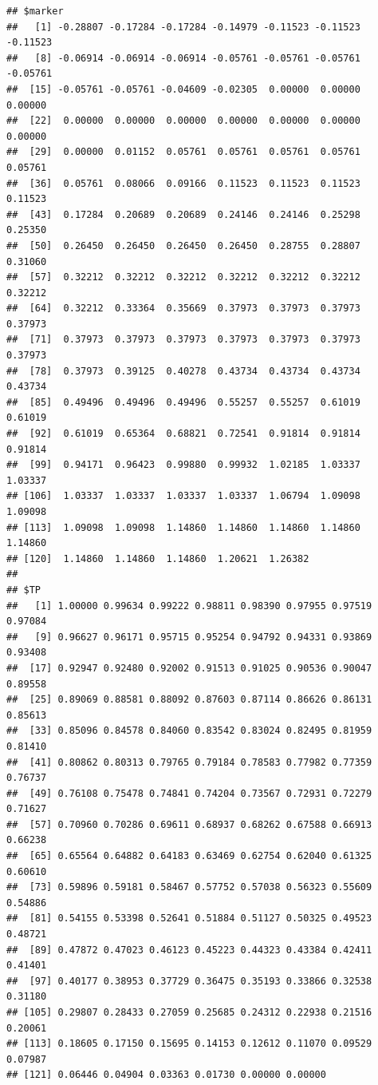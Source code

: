 \documentclass{article}\usepackage[]{graphicx}\usepackage[]{color}
\makeatletter
\newenvironment{kframe}{%
 \def\at@end@of@kframe{}%
 \ifinner\ifhmode%
  \def\at@end@of@kframe{\end{minipage}}%
  \begin{minipage}{\columnwidth}%
 \fi\fi%
 \def\FrameCommand##1{\hskip\@totalleftmargin \hskip-\fboxsep
 \colorbox{shadecolor}{##1}\hskip-\fboxsep
     \hskip-\linewidth \hskip-\@totalleftmargin \hskip\columnwidth}%
 \MakeFramed {\advance\hsize-\width
   \@totalleftmargin\z@ \linewidth\hsize
   \@setminipage}}%
 {\par\unskip\endMakeFramed%
 \at@end@of@kframe}
\newenvironment{knitrout}{}{} %
\makeatother
\begin{document}
\begin{knitrout}
{}


\begin{kframe}\begin{verbatim}
## $marker
##   [1] -0.28807 -0.17284 -0.17284 -0.14979 -0.11523 -0.11523 -0.11523
##   [8] -0.06914 -0.06914 -0.06914 -0.05761 -0.05761 -0.05761 -0.05761
##  [15] -0.05761 -0.05761 -0.04609 -0.02305  0.00000  0.00000  0.00000
##  [22]  0.00000  0.00000  0.00000  0.00000  0.00000  0.00000  0.00000
##  [29]  0.00000  0.01152  0.05761  0.05761  0.05761  0.05761  0.05761
##  [36]  0.05761  0.08066  0.09166  0.11523  0.11523  0.11523  0.11523
##  [43]  0.17284  0.20689  0.20689  0.24146  0.24146  0.25298  0.25350
##  [50]  0.26450  0.26450  0.26450  0.26450  0.28755  0.28807  0.31060
##  [57]  0.32212  0.32212  0.32212  0.32212  0.32212  0.32212  0.32212
##  [64]  0.32212  0.33364  0.35669  0.37973  0.37973  0.37973  0.37973
##  [71]  0.37973  0.37973  0.37973  0.37973  0.37973  0.37973  0.37973
##  [78]  0.37973  0.39125  0.40278  0.43734  0.43734  0.43734  0.43734
##  [85]  0.49496  0.49496  0.49496  0.55257  0.55257  0.61019  0.61019
##  [92]  0.61019  0.65364  0.68821  0.72541  0.91814  0.91814  0.91814
##  [99]  0.94171  0.96423  0.99880  0.99932  1.02185  1.03337  1.03337
## [106]  1.03337  1.03337  1.03337  1.03337  1.06794  1.09098  1.09098
## [113]  1.09098  1.09098  1.14860  1.14860  1.14860  1.14860  1.14860
## [120]  1.14860  1.14860  1.14860  1.20621  1.26382
## 
## $TP
##   [1] 1.00000 0.99634 0.99222 0.98811 0.98390 0.97955 0.97519 0.97084
##   [9] 0.96627 0.96171 0.95715 0.95254 0.94792 0.94331 0.93869 0.93408
##  [17] 0.92947 0.92480 0.92002 0.91513 0.91025 0.90536 0.90047 0.89558
##  [25] 0.89069 0.88581 0.88092 0.87603 0.87114 0.86626 0.86131 0.85613
##  [33] 0.85096 0.84578 0.84060 0.83542 0.83024 0.82495 0.81959 0.81410
##  [41] 0.80862 0.80313 0.79765 0.79184 0.78583 0.77982 0.77359 0.76737
##  [49] 0.76108 0.75478 0.74841 0.74204 0.73567 0.72931 0.72279 0.71627
##  [57] 0.70960 0.70286 0.69611 0.68937 0.68262 0.67588 0.66913 0.66238
##  [65] 0.65564 0.64882 0.64183 0.63469 0.62754 0.62040 0.61325 0.60610
##  [73] 0.59896 0.59181 0.58467 0.57752 0.57038 0.56323 0.55609 0.54886
##  [81] 0.54155 0.53398 0.52641 0.51884 0.51127 0.50325 0.49523 0.48721
##  [89] 0.47872 0.47023 0.46123 0.45223 0.44323 0.43384 0.42411 0.41401
##  [97] 0.40177 0.38953 0.37729 0.36475 0.35193 0.33866 0.32538 0.31180
## [105] 0.29807 0.28433 0.27059 0.25685 0.24312 0.22938 0.21516 0.20061
## [113] 0.18605 0.17150 0.15695 0.14153 0.12612 0.11070 0.09529 0.07987
## [121] 0.06446 0.04904 0.03363 0.01730 0.00000 0.00000

\end{verbatim}
\end{kframe}
\end{knitrout}
\end{document}

